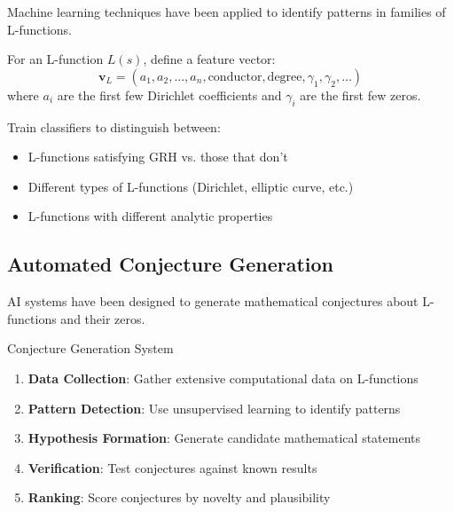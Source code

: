 Machine learning techniques have been applied to identify patterns in families of L-functions.

\begin{definition}
\label{def:l_function_features}
For an L-function $L(s)$, define a feature vector:
\begin{equation}
\mathbf{v}_L = (a_1, a_2, \ldots, a_n, \text{conductor}, \text{degree}, \gamma_1, \gamma_2, \ldots)
\label{eq:l_function_features}
\end{equation}
where $a_i$ are the first few Dirichlet coefficients and $\gamma_i$ are the first few zeros.
\end{definition}

\begin{experiment}
\label{exp:l_function_classification}
Train classifiers to distinguish between:
\begin{itemize}
\item L-functions satisfying GRH vs. those that don't
\item Different types of L-functions (Dirichlet, elliptic curve, etc.)
\item L-functions with different analytic properties
\end{itemize}
\end{experiment}

\subsection{Automated Conjecture Generation}

AI systems have been designed to generate mathematical conjectures about L-functions and their zeros.

\begin{algorithm}
\caption{Conjecture Generation System}
\label{alg:conjecture_generation}
\begin{enumerate}
\item \textbf{Data Collection}: Gather extensive computational data on L-functions
\item \textbf{Pattern Detection}: Use unsupervised learning to identify patterns
\item \textbf{Hypothesis Formation}: Generate candidate mathematical statements
\item \textbf{Verification}: Test conjectures against known results
\item \textbf{Ranking}: Score conjectures by novelty and plausibility
\end{enumerate}
\end{algorithm}

